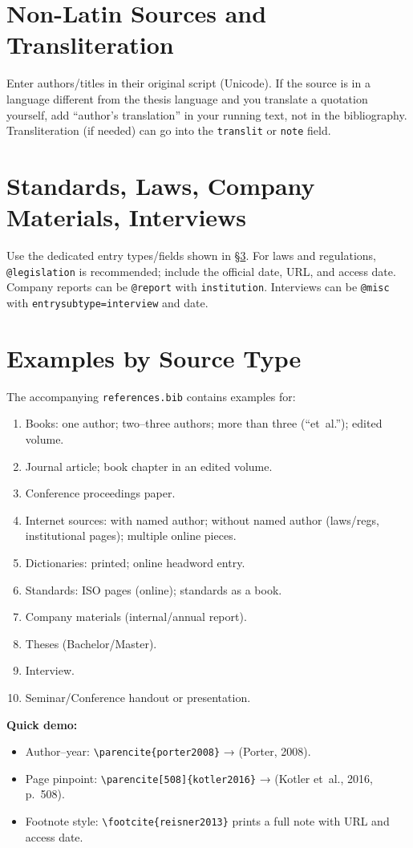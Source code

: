 \section{Non-Latin Sources and Transliteration}
Enter authors/titles in their original script (Unicode). If the source is in a language different from the thesis language and you translate a quotation yourself, add ``author’s translation'' in your running text, not in the bibliography. Transliteration (if needed) can go into the \texttt{translit} or \texttt{note} field.

\section{Standards, Laws, Company Materials, Interviews}
Use the dedicated entry types/fields shown in §\ref{sec:examples}. For laws and regulations, \texttt{@legislation} is recommended; include the official date, URL, and access date. Company reports can be \texttt{@report} with \texttt{institution}. Interviews can be \texttt{@misc} with \texttt{entrysubtype=interview} and date.

\section{Examples by Source Type}
\label{sec:examples}
The accompanying \texttt{references.bib} contains examples for:
\begin{enumerate}
  \item Books: one author; two–three authors; more than three (``et~al.''); edited volume.
  \item Journal article; book chapter in an edited volume.
  \item Conference proceedings paper.
  \item Internet sources: with named author; without named author (laws/regs, institutional pages); multiple online pieces.
  \item Dictionaries: printed; online headword entry.
  \item Standards: ISO pages (online); standards as a book.
  \item Company materials (internal/annual report).
  \item Theses (Bachelor/Master).
  \item Interview.
  \item Seminar/Conference handout or presentation.
\end{enumerate}

\noindent \textbf{Quick demo:}
\begin{itemize}
  \item Author–year: \verb|\parencite{porter2008}| → (Porter, 2008).
  \item Page pinpoint: \verb|\parencite[508]{kotler2016}| → (Kotler et~al., 2016, p.~508).
  \item Footnote style: \verb|\footcite{reisner2013}| prints a full note with URL and access date.
\end{itemize}

